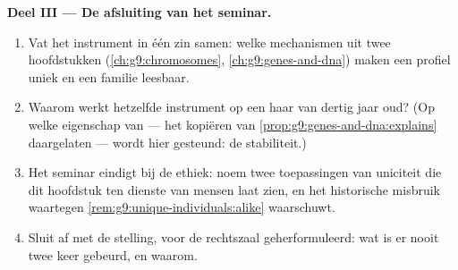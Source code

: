 \begin{problem}
\medskip\noindent\textbf{Deel III --- De afsluiting van het
seminar.}
\begin{enumerate}[resume]
  \item Vat het instrument in één zin samen: welke mechanismen
        uit twee hoofdstukken
        (\cref{ch:g9:chromosomes},
        \cref{ch:g9:genes-and-dna}) maken een profiel uniek en
        een familie leesbaar.
  \item Waarom werkt hetzelfde instrument op een haar van dertig
        jaar oud? (Op welke eigenschap van  --- het kopiëren
        van \cref{prop:g9:genes-and-dna:explains} daargelaten ---
        wordt hier gesteund: de stabiliteit.)
  \item Het seminar eindigt bij de ethiek: noem twee toepassingen
        van uniciteit die dit hoofdstuk ten dienste van mensen
        laat zien, en het historische misbruik waartegen
        \cref{rem:g9:unique-individuals:alike}
        waarschuwt.
  \item Sluit af met de stelling, voor de rechtszaal
        geherformuleerd: wat is er nooit twee keer gebeurd, en
        waarom.
\end{enumerate}
\end{problem}
